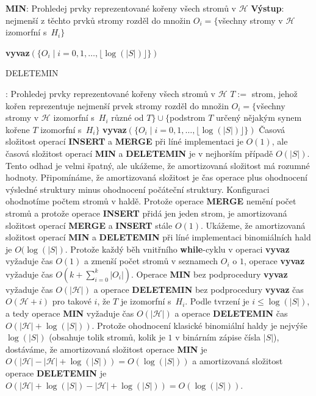 \documentclass[a4paper,12pt]{article}
\begin{document}
{\bf MIN}:\newline 
Prohledej prvky reprezentované kořeny všech 
stromů  
v $\mathcal H$\newline 
{\bf Výstup}: nejmenší z těchto prvků\newline 
stromy rozděl do množin $O_i=\{$všechny stromy v 
$\mathcal H$ izomorfní s~$H_i\}$\newline 
{\bf vyvaz$(\{O_i\mid i=0,1,\dots,\lfloor\log(|S|)\rfloor \})$

DELETEMIN}:\newline 
Prohledej prvky reprezentované kořeny všech 
stromů v $\mathcal H$\newline 
$T:=$ strom, jehož kořen repre\-zentuje nejmenší 
prvek\newline 
stromy rozděl do množin $O_i=\{$všechny stromy v 
$\mathcal H$ izomorfní s~$H_i$ různé od $T\}\cup \{$podstrom $
T$ určený nějakým synem kořene $T$ 
izomorfní s~$H_i\}$\newline 
{\bf vyvaz$(\{O_i\mid i=0,1,\dots,\lfloor\log(|S|)\rfloor \})$
}Časová složitost operací {\bf INSERT} a {\bf MER\-GE} při líné 
implementaci je $O(1)$, ale časová složitost operací {\bf MIN} a 
{\bf DELETEMIN} je v nejhorším případě $O(|S|)$. Tento odhad je 
velmi špatný, ale ukážeme, že amortizovaná složitost má rozumné 
hodnoty. 
Připomínáme, že amortizovaná složi\-tost je čas operace plus 
ohodnocení výsledné struktury minus ohodnocení 
počáteční struktury. 
Konfiguraci ohodnotíme počtem stromů v 
haldě. 
Protože ope\-race {\bf MERGE} nemění počet stromů a 
protože operace {\bf INSERT} přidá jen jeden strom, je 
amortizovaná složitost operací {\bf MERGE} a {\bf INSERT} stále $
O(1)$.
Ukážeme, že amortizovaná složitost operací {\bf MIN} a {\bf DELETEMIN }
při líné implementaci binomiálních hald je $O(\log
(|S|)$. 
Protože každý běh 
vnitřního {\bf while}-cyklu v operaci {\bf vyvaz} vyžaduje čas $
O(1)$ 
a zmenší počet stromů v seznamech $O_i$ o $1$, 
ope\-ra\-ce {\bf vyvaz} vyžaduje čas $O(k+\sum_{i=0}^k|O_i|
)$. Ope\-ra\-ce {\bf MIN}
bez podprocedury {\bf vyvaz} vyžaduje čas $O(|\mathcal H|)$ a operace 
{\bf DELETEMIN} bez podprocedury {\bf vyvaz }čas $O(\mathcal H+i)$ pro 
takové $i$, že $T$ je izomorfní s~$H_i$. Podle tvrzení je $
i\le\log(|S|)$, a 
tedy ope\-ra\-ce {\bf MIN} vyžaduje čas $O(|\mathcal H|)$ a ope\-race 
{\bf DELETEMIN }čas $O(|\mathcal H|+\log(|S|))$. Protože  
ohodnocení klasické binomiální haldy je nejvýše $\log
(|S|)$ 
(obsahuje tolik stromů, kolik je $1$ v binárním zápise 
čísla $|S|$), dostáváme, že amortizovaná složitost ope\-race {\bf MIN} je 
$O(|\mathcal H|-|\mathcal H|+\log(|S|))=O(\log(|S|))$ a amortizovaná složitost 
operace {\bf DELETEMIN} je $O(|\mathcal H|+\log(|S|)-|\mathcal H|+\log(|S
|))=O(\log(|S|))$.
\end{document}
